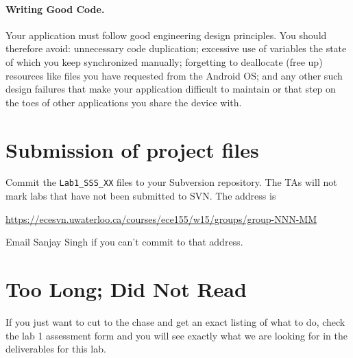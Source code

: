 \documentclass[10pt]{article}
\newcommand{\todo}[1]{{\red\textbf{TODO: }#1}\xspace}
\begin{document}
\paragraph{Writing Good Code.} Your application must follow good engineering design principles. You should therefore avoid: unnecessary code duplication; excessive use of variables the state of which you keep synchronized manually; forgetting to deallocate (free up) resources like files you have requested from the Android OS; and any other such design failures that make your application difficult to maintain or that step on the toes of other applications you share the device with.

\section{Submission of project files}
Commit the {\tt Lab1\_SSS\_XX} files to your Subversion repository. The TAs will not mark labs that have not been submitted to SVN. The address is

\url{https://ecesvn.uwaterloo.ca/courses/ece155/w15/groups/group-NNN-MM}

Email Sanjay Singh if you can't commit to that address.


\section{Too Long; Did Not Read}
If you just want to cut to the chase and get an exact listing of what to do, check the lab 1 assessment form and you will see exactly what we are looking for in the deliverables for this lab.
\end{document}

